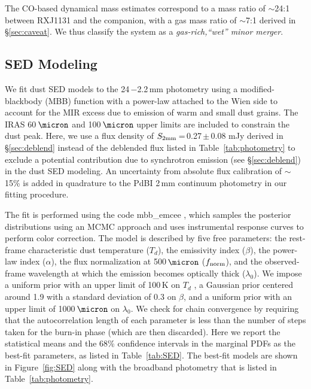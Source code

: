 \documentclass[]{emulateapj}
\newcommand{\eq}{\,=\,}
\newcommand{\pmm}{\,$\pm$\,}
\newcommand{\Fig}[1]{Figure~\ref{fig:#1}}
\newcommand{\Tab}[1]{Table~\ref{tab:#1}}
\newcommand{\Sec}[1]{\S\ref{sec:#1}}
\newcommand{\ncode}[1]{{\sc #1}}
\begin{document}
The CO-based dynamical mass estimates correspond to a mass ratio of $\sim$24:1
between RXJ1131 and the companion, with a gas mass ratio of $\sim$7:1 derived in  \Sec{caveat}.
We thus classify the system as a {\em gas-rich,``wet'' minor merger}.


\subsection{SED Modeling} \label{sec:SED}
We fit dust SED models to the 24\,\micron$-$2.2\,mm photometry
using a modified-blackbody (MBB)
function with a power-law attached to the Wien side to account for the MIR excess due to
emission of warm and small dust grains.
The IRAS 60\,$\micron$ and 100\,$\micron$ upper limits are included to constrain the dust peak.
Here, we use a flux density of $S_{\rm 2mm}$\eq0.27\pmm0.08 mJy derived in \Sec{deblend}
instead of the deblended flux listed in \Tab{photometry}
to exclude a potential contribution due to synchrotron emission (see \Sec{deblend}) in the dust SED modeling.
An uncertainty from absolute flux calibration of $\sim$15\% is added in quadrature
to the PdBI 2\,mm continuum photometry in our fitting procedure.


The fit is performed using the code
\ncode{mbb\_emcee} \citep[e.g.,][]{Riechers13a,Dowell14a}, which samples the posterior
distributions using an MCMC approach and uses instrumental
response curves to perform color correction.
The model is described by five free parameters: the rest-frame characteristic dust
temperature ($T_{d}$), the emissivity index ($\beta$), the power-law index
($\alpha$), the flux normalization at 500\,$\micron$ ($f_{\rm norm}$), and
the observed-frame wavelength at which the emission
becomes optically thick ($\lambda_{0}$). We impose
a uniform prior with an upper limit of 100\,K on $T_d$ \citep[see e.g.,][]{Sajina12a},
a Gaussian prior centered around
1.9 with a standard deviation of 0.3 on $\beta$, and a uniform prior with an upper limit of
1000\,$\micron$ on $\lambda_0$.
We check for chain convergence by requiring that the autocorrelation
length of each parameter is less than the number of steps
taken for the burn-in phase (which are then discarded).
Here we report the statistical means
and the 68\% confidence intervals in the marginal PDFs
as the best-fit parameters, as listed in \Tab{SED}.
The best-fit models are shown in \Fig{SED} along with the broadband photometry that is listed in \Tab{photometry}.
\end{document}
